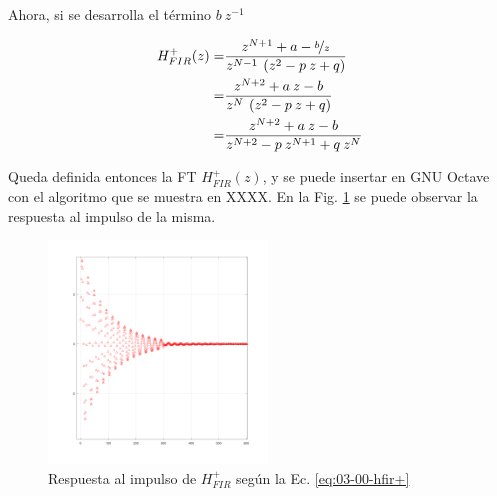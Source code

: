 \message{ !name(../main.tex)}\documentclass[journal,transmag]{IEEEtran}
\begin{document}
    Ahora, si se desarrolla el término $b \: z^{-1}$

    \begin{align}
      H_{FIR}^{+}(z) =& \frac{z^{N+1} + a - \nicefrac{b}{z}}{z^{N-1} \: \left( z^{2} - p \: z + q \right)} \nonumber \\
      =& \frac{z^{N+2} + a \: z - b}{z^{N} \: \left( z^{2} - p \: z + q \right)} \nonumber \\
      =& \frac{z^{N+2} + a \: z - b}{z^{N+2} - p \: z^{N+1} + q \: z^{N}}
      \label{eq:03-00-hfir+}
    \end{align}

    Queda definida entonces la FT $H_{FIR}^{+}(z)$, y se puede insertar en GNU Octave con el algoritmo que se muestra en XXXX. En la Fig. \ref{fig:03-00-hfir+} se puede observar la respuesta al impulso de la misma.

    \begin{figure}
      \centering
      \includegraphics[width=0.52\textwidth]{../images/03-00-hfir+.png}
      \caption{Respuesta al impulso de $H_{FIR}^{+}$ según la Ec. \ref{eq:03-00-hfir+}}
      \label{fig:03-00-hfir+}
    \end{figure}


\end{document}
